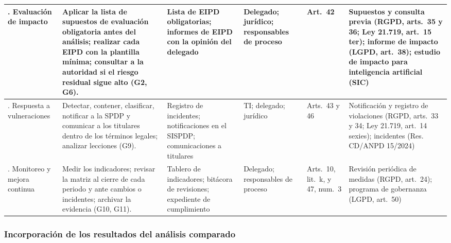 {\begin{xltabular}{\textwidth}{|>{\raggedright\arraybackslash}p{1.6cm}|L|>{\raggedright\arraybackslash}p{2.5cm}|>{\raggedright\arraybackslash}p{1.9cm}|>{\raggedright\arraybackslash}p{1.5cm}|>{\raggedright\arraybackslash}p{2.4cm}|}
  2. Evaluación de impacto & Aplicar la lista de supuestos de evaluación obligatoria antes del análisis; realizar cada EIPD con la plantilla mínima; consultar a la autoridad si el riesgo residual sigue alto (G2, G6). & Lista de EIPD obligatorias; informes de EIPD con la opinión del delegado & Delegado; jurídico; responsables de proceso & Art.~42 & Supuestos y consulta previa (RGPD, arts.~35 y 36; Ley 21.719, art.~15 ter); informe de impacto (LGPD, art.~38); estudio de impacto para inteligencia artificial (SIC) \cite{rgpd2016,chile2024ley21719,brasil2018lgpd,sic2026universitario} \\ . Respuesta a vulneraciones & Detectar, contener, clasificar, notificar a la SPDP y comunicar a los titulares dentro de los términos legales; analizar lecciones (G9). & Registro de incidentes; notificaciones en el SISPDP; comunicaciones a titulares & TI; delegado; jurídico & Arts.~43 y 46 & Notificación y registro de violaciones (RGPD, arts.~33 y 34; Ley 21.719, art.~14 sexies); incidentes (Res. CD/ANPD 15/2024) \cite{rgpd2016,chile2024ley21719,anpd2024incidentes} \\ . Monitoreo y mejora continua & Medir los indicadores; revisar la matriz al cierre de cada periodo y ante cambios o incidentes; archivar la evidencia (G10, G11). & Tablero de indicadores; bitácora de revisiones; expediente de cumplimiento & Delegado; responsables de proceso & Arts.~10, lit.~k, y 47, num.~3 & Revisión periódica de medidas (RGPD, art.~24); programa de gobernanza (LGPD, art.~50) \cite{rgpd2016,brasil2018lgpd} \\ \hline
\end{xltabular}
}
{\raggedright{}\par}

\subsubsection{Incorporación de los resultados del análisis comparado}
\label{sec:incorporacion_comparado}

